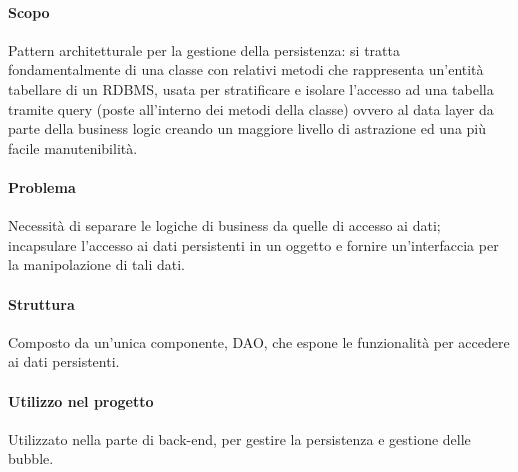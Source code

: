 \documentclass[../PianoDiQualifica.tex]{subfiles}
\begin{document}
			\paragraph{Scopo\\}
			 Pattern architetturale per la gestione della persistenza: si tratta fondamentalmente di una classe con relativi metodi che rappresenta un'entità tabellare di un RDBMS, usata per stratificare e isolare l'accesso ad una tabella tramite query (poste all'interno dei metodi della classe) ovvero al data layer da parte della business logic creando un maggiore livello di astrazione ed una più facile manutenibilità.
			\paragraph{Problema\\}
			Necessità di separare le logiche di business da quelle di accesso ai dati; incapsulare l'accesso ai dati persistenti in un oggetto e fornire un'interfaccia 
			per la manipolazione di tali dati.
			\paragraph{Struttura\\}
			Composto da un'unica componente, DAO, che espone le funzionalità per accedere ai dati persistenti.			
			\paragraph{Utilizzo nel progetto\\}
			Utilizzato nella parte di back-end, per gestire la persistenza e gestione delle bubble.
			
\end{document}
